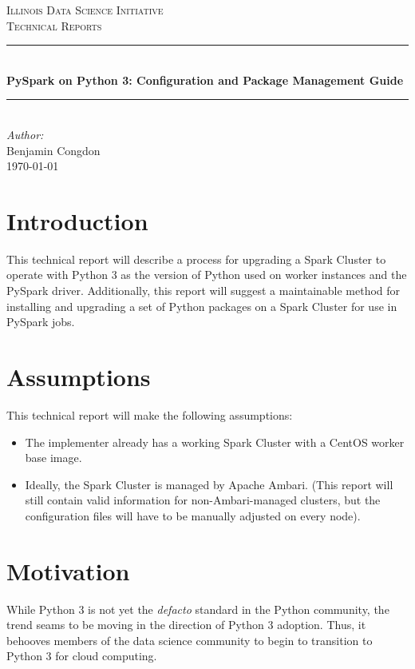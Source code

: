 \documentclass[9pt,twocolumn,twoside]{idsi}
\author[1]{Benjamin Congdon}
\author[2]{Professor Robert J. Brunner}
\affil[1]{National Center For Supercomputing Applications (NCSA)}
\affil[2]{Laboratory for Computation, Data, and Machine Learning}
\title{\reporttitle}
\newcommand{\HRule}{\rule{\linewidth}{0.5mm}}
\def \reporttitle {PySpark on Python 3: Configuration and Package Management Guide}
\begin{document}
\begin{titlepage}
\center 
\textsc{\LARGE Illinois Data Science Initiative}\\[1.5cm] 
\textsc{\Large Technical Reports}\\[0.5cm] \HRule \\[0.4cm]
{\huge \bfseries \reporttitle } \\[0.4cm] \HRule \\[1.5cm]
\Large \emph{Author:}\\ Benjamin Congdon\\[3cm]
{\large \today}\\[3cm] %
\vfill
\end{titlepage}


\maketitle

\section{Introduction}
This technical report will describe a process for upgrading a Spark Cluster to operate with Python 3 as the version of Python used on worker instances and the PySpark driver. Additionally, this report will suggest a maintainable method for installing and upgrading a set of Python packages on a Spark Cluster for use in PySpark jobs.

\section{Assumptions}
This technical report will make the following assumptions:
\begin{itemize}
  \item The implementer already has a working Spark Cluster with a CentOS worker base image.
  \item Ideally, the Spark Cluster is managed by Apache Ambari. (This report will still contain valid information for non-Ambari-managed clusters, but the configuration files will have to be manually adjusted on every node).
\end{itemize}

\section{Motivation}
While Python 3 is not yet the \emph{defacto} standard in the Python community, the trend seams to be moving in the direction of Python 3 adoption. Thus, it behooves members of the data science community to begin to transition to Python 3 for cloud computing.
\end{document}
